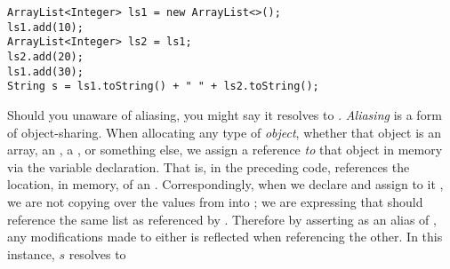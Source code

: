 \par{
\begin{verbatim}
ArrayList<Integer> ls1 = new ArrayList<>();
ls1.add(10);
ArrayList<Integer> ls2 = ls1;
ls2.add(20);
ls1.add(30);
String s = ls1.toString() + " " + ls2.toString();
\end{verbatim}
}
Should you unaware of aliasing, you might say it resolves to . \textit{Aliasing} is a form of object-sharing. When allocating any type of \textit{object}, whether that object is an array, an , a , or something else, we assign a reference \textit{to} that object in memory via the variable declaration. That is, in the preceding code,  references the location, in memory, of an . Correspondingly, when we declare  and assign to it , we are not copying over the values from  into ; we are expressing that  should reference the same list as referenced by . Therefore by asserting  as an alias of , any modifications made to either is reflected when referencing the other. In this instance, $s$ resolves to 

